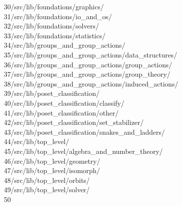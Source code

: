 \begin{tabbing}
30\>/src/lib/foundations/graphics/\\[0pt]
31\>/src/lib/foundations/io\_and\_os/\\[0pt]
32\>/src/lib/foundations/solvers/\\[0pt]
33\>/src/lib/foundations/statistics/\\[0pt]
34\>/src/lib/groups\_and\_group\_actions/\\[0pt]
35\>/src/lib/groups\_and\_group\_actions/data\_structures/\\[0pt]
36\>/src/lib/groups\_and\_group\_actions/group\_actions/\\[0pt]
37\>/src/lib/groups\_and\_group\_actions/group\_theory/\\[0pt]
38\>/src/lib/groups\_and\_group\_actions/induced\_actions/\\[0pt]
39\>/src/lib/poset\_classification/\\[0pt]
40\>/src/lib/poset\_classification/classify/\\[0pt]
41\>/src/lib/poset\_classification/other/\\[0pt]
42\>/src/lib/poset\_classification/set\_stabilizer/\\[0pt]
43\>/src/lib/poset\_classification/snakes\_and\_ladders/\\[0pt]
44\>/src/lib/top\_level/\\[0pt]
45\>/src/lib/top\_level/algebra\_and\_number\_theory/\\[0pt]
46\>/src/lib/top\_level/geometry/\\[0pt]
47\>/src/lib/top\_level/isomorph/\\[0pt]
48\>/src/lib/top\_level/orbits/\\[0pt]
49\>/src/lib/top\_level/solver/\\[0pt]
50\>\end{tabbing}
